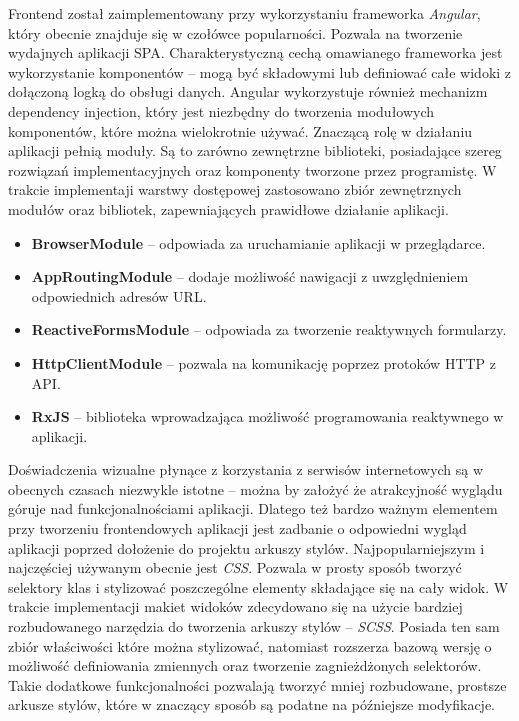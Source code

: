 Frontend został zaimplementowany przy wykorzystaniu frameworka \textit{Angular}, który obecnie znajduje się w czołówce popularności. Pozwala na tworzenie wydajnych aplikacji SPA. Charakterystyczną cechą omawianego frameworka jest wykorzystanie komponentów -- mogą być składowymi lub definiować całe widoki z dołączoną logką do obsługi danych. Angular wykorzystuje również mechanizm dependency injection, który jest niezbędny do tworzenia modułowych komponentów, które można wielokrotnie używać. Znaczącą rolę w działaniu aplikacji pełnią moduły. Są to zarówno zewnętrzne biblioteki, posiadające szereg rozwiązań implementacyjnych oraz komponenty tworzone przez programistę. W trakcie implementaji warstwy dostępowej zastosowano zbiór zewnętrznych modułów oraz bibliotek, zapewniających prawidłowe działanie aplikacji.
\begin{itemize}[leftmargin=1cm]
    \item \textbf{BrowserModule} -- odpowiada za uruchamianie aplikacji w przeglądarce.
    \item \textbf{AppRoutingModule} -- dodaje możliwość nawigacji z uwzględnieniem odpowiednich adresów URL.
    \item \textbf{ReactiveFormsModule} -- odpowiada za tworzenie reaktywnych formularzy.
    \item \textbf{HttpClientModule} -- pozwala na komunikację poprzez protoków HTTP z API.
    \item \textbf{RxJS} -- biblioteka wprowadzająca możliwość programowania reaktywnego w aplikacji.
\end{itemize}

Doświadczenia wizualne płynące z korzystania z serwisów internetowych są w obecnych czasach niezwykle istotne -- można by założyć że atrakcyjność wyglądu góruje nad funkcjonalnościami aplikacji. Dlatego też bardzo ważnym elementem przy tworzeniu frontendowych aplikacji jest zadbanie o odpowiedni wygląd aplikacji poprzed dołożenie do projektu arkuszy stylów. Najpopularniejszym i najczęściej używanym obecnie jest \textit{CSS}. Pozwala w prosty sposób tworzyć selektory klas i stylizować poszczególne elementy składające się na cały widok. W trakcie implementacji makiet widoków zdecydowano się na użycie bardziej rozbudowanego narzędzia do tworzenia arkuszy stylów -- \textit{SCSS}. Posiada ten sam zbiór właściwości które można stylizować, natomiast rozszerza bazową wersję o możliwość definiowania zmiennych oraz tworzenie zagnieżdżonych selektorów. Takie dodatkowe funkcjonalności pozwalają tworzyć mniej rozbudowane, prostsze arkusze stylów, które w znaczący sposób są podatne na późniejsze modyfikacje.